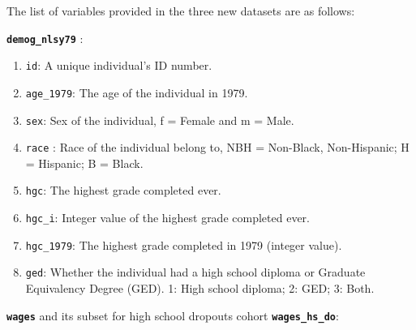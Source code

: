 \documentclass[12pt]{article}
\providecommand{\tightlist}{%
  \setlength{\itemsep}{0pt}\setlength{\parskip}{0pt}}
\begin{document}
The list of variables provided in the three new datasets are as follows:

\textbf{\texttt{demog\_nlsy79}} :

\begin{enumerate}
\def\labelenumi{\arabic{enumi}.}
\tightlist
\item
  \texttt{id}: A unique individual's ID number.
\item
  \texttt{age\_1979}: The age of the individual in 1979.
\item
  \texttt{sex}: Sex of the individual, f = Female and m = Male.
\item
  \texttt{race} : Race of the individual belong to, NBH = Non-Black, Non-Hispanic; H = Hispanic; B = Black.
\item
  \texttt{hgc}: The highest grade completed ever.
\item
  \texttt{hgc\_i}: Integer value of the highest grade completed ever.
\item
  \texttt{hgc\_1979}: The highest grade completed in 1979 (integer value).
\item
  \texttt{ged}: Whether the individual had a high school diploma or Graduate Equivalency Degree (GED). 1: High school diploma; 2: GED; 3: Both.
\end{enumerate}

\textbf{\texttt{wages}} and its subset for high school dropouts cohort \textbf{\texttt{wages\_hs\_do}}:
\end{document}
